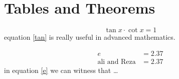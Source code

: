 \documentclass[12pt]{article}
\begin{document}
\section{Tables and Theorems}
\begin{equation}
    \tan x \cdot \cot x = 1
    \label{tan}
\end{equation}
equation \eqref{tan} is really useful in advanced mathematics.

\begin{equation}
    \begin{split}
        e & = 2.37 \\
        \text{ali and Reza} & = 2.37
        \label{e}
    \end{split}
\end{equation}
in equation \eqref{e} we can witness that \dots
\end{document}
